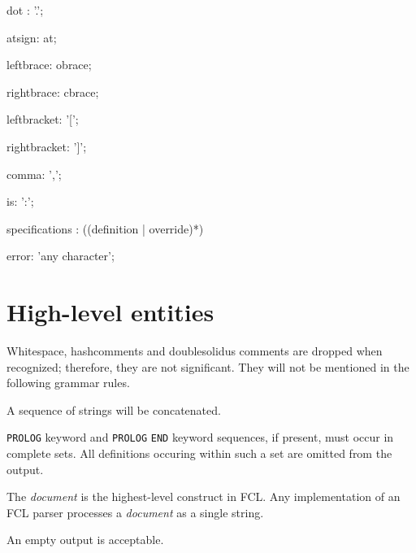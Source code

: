 \documentclass[twoside]{memarticle}
\begin{document}
\begin{rail}
dot : '.';
\end{rail}

\begin{rail}
atsign: at;
\end{rail}

\begin{rail}
leftbrace: obrace;
\end{rail}

\begin{rail}
rightbrace: cbrace;
\end{rail}

\begin{rail}
leftbracket: '[';
\end{rail}

\begin{rail}
rightbracket: ']';
\end{rail}

\begin{rail}
comma: ',';
\end{rail}

\begin{rail}
is: ':';
\end{rail}

\begin{rail}
specifications : ((definition | override)*)
\end{rail}

\begin{rail}
error: 'any character';
\end{rail}

\section{High-level entities}

Whitespace, hashcomments and doublesolidus comments are dropped
when recognized;
therefore, they are not significant.
They will not be mentioned in the following grammar rules.

A sequence of strings will be concatenated.

\texttt{PROLOG} keyword and \texttt{PROLOG} \texttt{END}
keyword sequences, if present, must occur in complete sets.
All definitions occuring within such a set are omitted from
the output.

The \emph{document} is the highest-level construct
in FCL.
Any implementation of an FCL parser
processes a \emph{document}
as a single string.

An empty output is acceptable.
\end{document}
